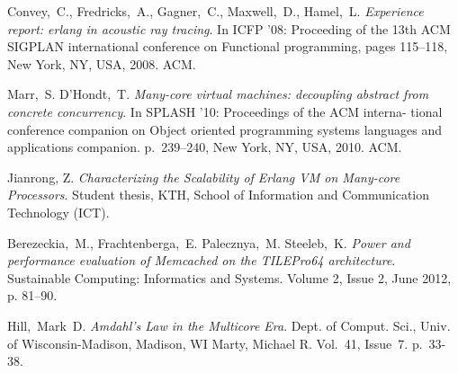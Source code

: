 \documentclass[english,11pt]{l4proj}
\begin{document}
\begin{thebibliography}{99}
     Convey,~C., Fredricks,~A., Gagner,~C.,
        Maxwell,~D., Hamel,~L. \emph{Experience report: erlang in acoustic ray
        tracing}. In ICFP ’08: Proceeding of the 13th ACM SIGPLAN international
        conference on Functional programming, pages 115–118, New York, NY, USA,
        2008. ACM.

     Marr,~S. D’Hondt,~T. \emph{Many-core virtual machines:
        decoupling abstract from concrete concurrency}. In SPLASH ’10:
        Proceedings of the ACM interna- tional conference companion on Object
        oriented programming systems languages and applications companion.
        p.~239–240, New York, NY, USA, 2010. ACM.

     Jianrong, Z. \emph{Characterizing the
        Scalability of Erlang VM on Many-core Processors}. Student thesis, KTH,
        School of Information and Communication Technology (ICT).

     Berezeckia,~M., Frachtenberga,~E. Palecznya,~M.
        Steeleb,~K. \emph{Power and performance evaluation of Memcached on the
        TILEPro64 architecture}. Sustainable Computing: Informatics and Systems.
        Volume 2, Issue 2, June 2012, p. 81–90.

     Hill,~Mark~D. \emph{Amdahl's Law in the Multicore
        Era}. Dept. of Comput. Sci., Univ. of Wisconsin-Madison, Madison, WI
        Marty, Michael R.  Vol.~41, Issue~7. p.~33-38.

\end{thebibliography}

\educationalconsent
\end{document}
